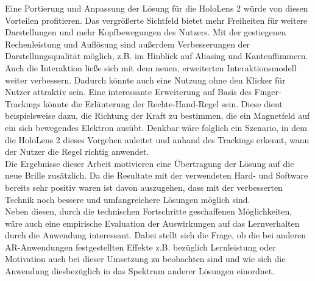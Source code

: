 Eine Portierung und Anpassung der Lösung für die HoloLens 2 würde von diesen Vorteilen profitieren. Das vergrößerte Sichtfeld bietet mehr Freiheiten für weitere Darstellungen und mehr Kopfbewegungen des Nutzers. Mit der gestiegenen Rechenleistung und Auflösung sind außerdem Verbesserungen der Darstellungsqualität möglich, z.B. im Hinblick auf Aliasing und Kantenflimmern. Auch die Interaktion ließe sich mit dem neuen, erweiterten Interaktionsmodell weiter verbessern. Dadurch könnte auch eine Nutzung ohne den Klicker für Nutzer attraktiv sein.
\noindent\hspace*{5mm}
Eine interessante Erweiterung auf Basis des Finger-Trackings könnte die Erläuterung der Rechte-Hand-Regel sein. Diese dient beispielsweise dazu, die Richtung der Kraft zu bestimmen, die ein Magnetfeld auf ein sich bewegendes Elektron ausübt. Denkbar wäre folglich ein Szenario, in dem die HoloLens 2 dieses Vorgehen anleitet und anhand des Trackings erkennt, wann der Nutzer die Regel richtig anwendet.\\

Die Ergebnisse dieser Arbeit motivieren eine Übertragung der Lösung auf die neue Brille zusätzlich. Da die Resultate mit der verwendeten Hard- und Software bereits sehr positiv waren ist davon auszugehen, dass mit der verbesserten Technik noch bessere und umfangreichere Lösungen möglich sind.\\

Neben diesen, durch die technischen Fortschritte geschaffenen Möglichkeiten, wäre auch eine empirische Evaluation der Auswirkungen auf das Lernverhalten durch die Anwendung interessant. Dabei stellt sich die Frage, ob die bei anderen AR-Anwendungen festgestellten Effekte z.B. bezüglich Lernleistung oder Motivation auch bei dieser Umsetzung zu beobachten sind und wie sich die Anwendung diesbezüglich in das Spektrum anderer Lösungen einordnet. 

